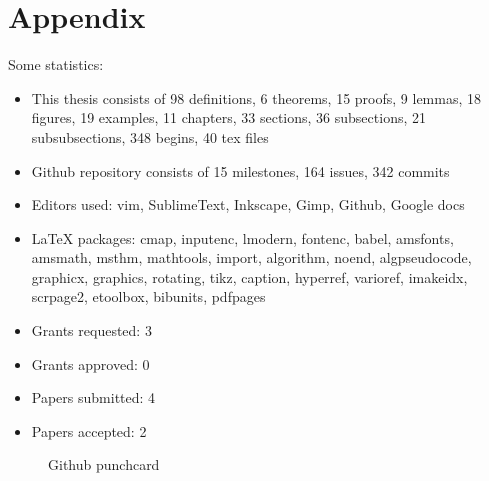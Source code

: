 \appendix
\ifdefined\godzilla
  \chapter*{Appendix}
  Some statistics:
  \begin{itemize}
    \item This thesis consists of 98 definitions, 6 theorems, 15 proofs, 9 lemmas, 18 figures, 19 examples, 11 chapters, 33 sections, 36 subsections, 21 subsubsections, 348 begins, 40 tex files
    \item Github repository consists of 15 milestones, 164 issues, 342 commits
    \item Editors used: vim, SublimeText, Inkscape, Gimp, Github, Google docs
    \item LaTeX packages: cmap, inputenc, lmodern, fontenc, babel, amsfonts, amsmath, msthm, mathtools, import, algorithm, noend, algpseudocode, graphicx, graphics, rotating, tikz, caption, hyperref, varioref, imakeidx, scrpage2, etoolbox, bibunits, pdfpages
    \item Grants requested: 3
    \item Grants approved: 0
    \item Papers submitted: 4
    \item Papers accepted: 2
  \end{itemize}
  \begin{sidewaysfigure}
    \centering
    \def\svgwidth{\columnwidth}
    
    \caption{Github punchcard}
  \end{sidewaysfigure}
\fi

